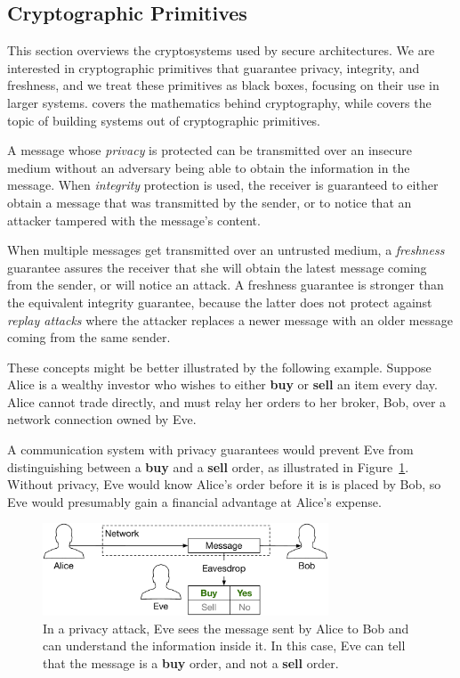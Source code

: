 \subsection{Cryptographic Primitives}

This section overviews the cryptosystems used by secure architectures. We are
interested in cryptographic primitives that guarantee privacy, integrity, and
freshness, and we treat these primitives as black boxes, focusing on their use
in larger systems. \cite{katz2014crypto} covers the mathematics behind
cryptography, while \cite{ferguson2011crypto} covers the topic of building
systems out of cryptographic primitives.

A message whose \textit{privacy} is protected can be transmitted over an
insecure medium without an adversary being able to obtain the information in
the message. When \textit{integrity} protection is used, the receiver is
guaranteed to either obtain a message that was transmitted by the sender, or to
notice that an attacker tampered with the message's content.

When multiple messages get transmitted over an untrusted medium, a
\textit{freshness} guarantee assures the receiver that she will obtain the
latest message coming from the sender, or will notice an attack. A freshness
guarantee is stronger than the equivalent integrity guarantee, because the
latter does not protect against \textit{replay attacks} where the attacker
replaces a newer message with an older message coming from the same sender.

These concepts might be better illustrated by the following example. Suppose
Alice is a wealthy investor who wishes to either \textbf{buy} or \textbf{sell}
an item every day. Alice cannot trade directly, and must relay her orders to
her broker, Bob, over a network connection owned by Eve.

A communication system with privacy guarantees would prevent Eve from
distinguishing between a \textbf{buy} and a \textbf{sell} order, as illustrated
in Figure~\ref{fig:privacy_attack}. Without privacy, Eve would know Alice's
order before it is is placed by Bob, so Eve would presumably gain a financial
advantage at Alice's expense.

\begin{figure}[hbt]
  \centering
  \includegraphics[width=85mm]{figures/privacy_attack.pdf}
  \caption{
    In a privacy attack, Eve sees the message sent by Alice to Bob and can
    understand the information inside it. In this case, Eve can tell that the
    message is a \textbf{buy} order, and not a \textbf{sell} order.
  }
  \label{fig:privacy_attack}
\end{figure}

